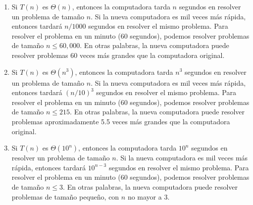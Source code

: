 \begin{enumerate}
	\item Si $T(n)$ es $\Theta(n)$, entonces la computadora tarda $n$ segundos en resolver un problema de tamaño $n$.
	      Si la nueva computadora es mil veces más rápida, entonces tardará $n/1000$ segundos en resolver el mismo problema.
	      Para resolver el problema en un minuto (60 segundos), podemos resolver problemas de tamaño $n \leq 60,000$.
	      En otras palabras, la nueva computadora puede resolver problemas 60 veces más grandes que la computadora original.
	\item Si $T(n)$ es $\Theta(n^3)$, entonces la computadora tarda $n^3$ segundos en resolver un problema de tamaño $n$.
	      Si la nueva computadora es mil veces más rápida, entonces tardará $(n/10)^3$ segundos en resolver el mismo problema.
	      Para resolver el problema en un minuto (60 segundos), podemos resolver problemas de tamaño $n \leq 215$.
	      En otras palabras, la nueva computadora puede resolver problemas aproximadamente 5.5 veces más grandes que la computadora original.
	\item Si $T(n)$ es $\Theta(10^n)$, entonces la computadora tarda $10^n$ segundos en resolver un problema de tamaño $n$.
	      Si la nueva computadora es mil veces más rápida, entonces tardará $10^{n-3}$ segundos en resolver el mismo problema.
	      Para resolver el problema en un minuto (60 segundos), podemos resolver problemas de tamaño $n \leq 3$.
	      En otras palabras, la nueva computadora puede resolver problemas de tamaño pequeño, con $n$ no mayor a 3.
\end{enumerate}